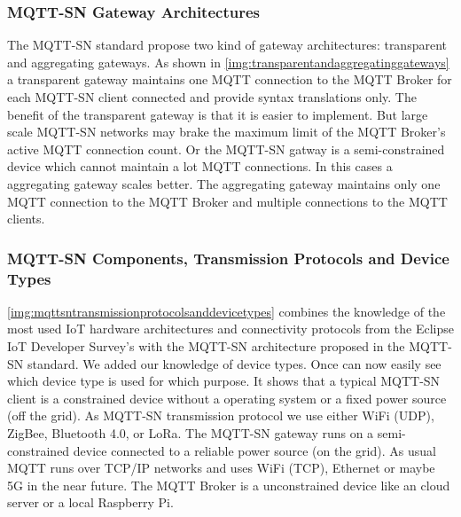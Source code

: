 \subsubsection{MQTT-SN Gateway Architectures}\label{sec:mqttsngatewayarchitectures}
The MQTT-SN standard propose two kind of gateway architectures: transparent and aggregating gateways.
As shown in \autoref{img:transparentandaggregatinggateways} a transparent gateway maintains one MQTT connection to the MQTT Broker for each MQTT-SN client connected and provide syntax translations only.
The benefit of the transparent gateway is that it is easier to implement.
But large scale MQTT-SN networks may brake the maximum limit of the MQTT Broker's active MQTT connection count.
Or the MQTT-SN gatway is a semi-constrained device which cannot maintain a lot MQTT connections.
In this cases a aggregating gateway scales better.
The aggregating gateway maintains only one MQTT connection to the MQTT Broker and multiple connections to the MQTT clients.
\subsubsection{MQTT-SN Components, Transmission Protocols and Device Types}
\autoref{img:mqttsntransmissionprotocolsanddevicetypes} combines the knowledge of the most used IoT hardware architectures and connectivity protocols from the Eclipse IoT Developer Survey's\cite{eclipseiotdevelopersurveyresults} with the MQTT-SN architecture proposed in the MQTT-SN standard\cite{mqttsnstandard}. We added our knowledge of device types.
Once can now easily see which device type is used for which purpose.
It shows that a typical MQTT-SN client is a constrained device without a operating system or a fixed power source (off the grid).
As MQTT-SN transmission protocol we use either WiFi (UDP), ZigBee, Bluetooth 4.0, or LoRa.
The MQTT-SN gateway runs on a semi-constrained device connected to a reliable power source (on the grid).
As usual MQTT runs over TCP/IP networks and uses WiFi (TCP), Ethernet or maybe 5G in the near future.
The MQTT Broker is a unconstrained device like an cloud server or a local Raspberry Pi.
